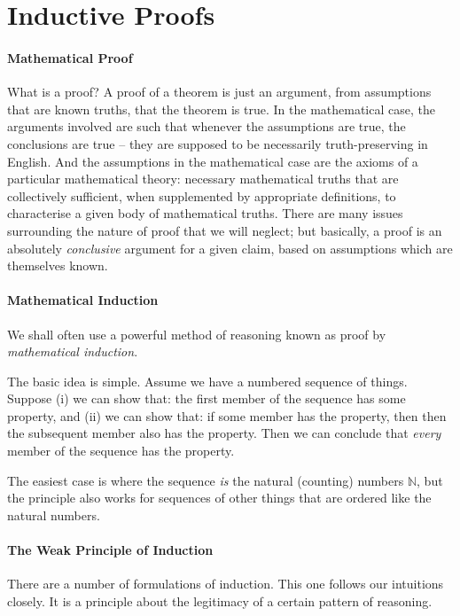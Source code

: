 

\section{Inductive Proofs}

\paragraph{Mathematical Proof} What is a proof? A proof of a theorem is just an argument, from assumptions that are known truths, that the theorem is true. In the mathematical case, the arguments involved are such that whenever the assumptions are true, the conclusions are true – they are supposed to be necessarily truth-preserving in English. And the assumptions in the mathematical case are the axioms of a particular mathematical theory: necessary mathematical truths that are collectively sufficient, when supplemented by appropriate definitions, to characterise a given body of mathematical truths. There are many issues surrounding the nature of proof that we will neglect; but basically, a proof is an absolutely \emph{conclusive} argument for a given claim, based on assumptions which are themselves known.


\paragraph{Mathematical Induction}
 We shall often use a powerful method of reasoning known as proof by \emph{mathematical induction}. 

The basic idea is simple. Assume we have a numbered sequence of things. Suppose (i) we can show that: the first member of the sequence has some property, and (ii) we can show that: if some member has the property, then then the subsequent member also has the property. Then we can conclude that \emph{every} member of the sequence has the property.

The easiest case is where the sequence \emph{is} the natural (counting) numbers $\mathbb{N}$, but the principle also works for sequences of other things that are ordered like the natural numbers.


\paragraph{The Weak Principle of Induction}

There are a number of formulations of induction. This one follows our intuitions closely. It is a principle about the legitimacy of a certain pattern of reasoning.

